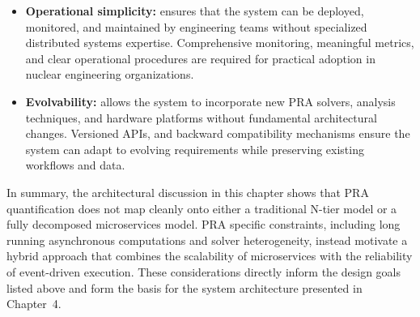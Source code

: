 \begin{itemize}
    \item \textbf{Operational simplicity:} ensures that the system can be deployed, monitored, and maintained by engineering teams without specialized distributed systems expertise. Comprehensive monitoring, meaningful metrics, and clear operational procedures are required for practical adoption in nuclear engineering organizations.

    \item \textbf{Evolvability:} allows the system to incorporate new PRA solvers, analysis techniques, and hardware platforms without fundamental architectural changes. Versioned APIs, and backward compatibility mechanisms ensure the system can adapt to evolving requirements while preserving existing workflows and data.
\end{itemize}

In summary, the architectural discussion in this chapter shows that PRA quantification does not map cleanly onto either a traditional N-tier model or a fully decomposed microservices model. PRA specific constraints, including long running asynchronous computations and solver heterogeneity, instead motivate a hybrid approach that combines the scalability of microservices with the reliability of event-driven execution. These considerations directly inform the design goals listed above and form the basis for the system architecture presented in Chapter~4.